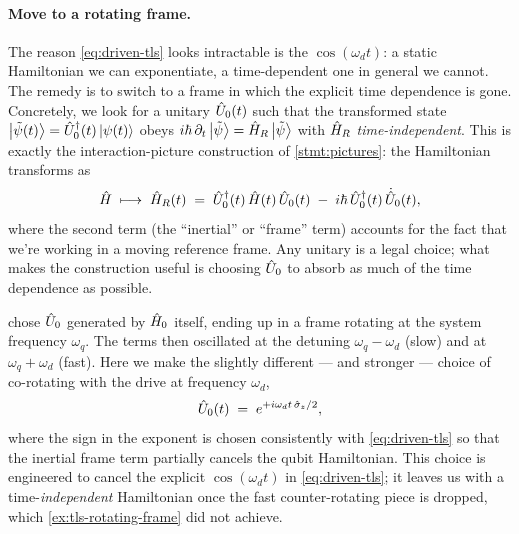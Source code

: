 \paragraph{Move to a rotating frame.}
The reason \cref{eq:driven-tls} looks intractable is the
$\cos(\omega_d t)$: a static Hamiltonian we can exponentiate, a
time-dependent one in general we cannot. The remedy is to switch
to a frame in which the explicit time dependence is gone.
Concretely, we look for a unitary $\hat{U}_0(t)$ such that the
transformed state $\ket{\tilde\psi(t)}=\hat{U}_0^\dagger(t)\ket{\psi(t)}$
obeys $i\hbar\,\partial_t\ket{\tilde\psi}=\hat{H}_R\ket{\tilde\psi}$
with $\hat{H}_R$ \emph{time-independent}. This is exactly the
interaction-picture construction of \cref{stmt:pictures}: the
Hamiltonian transforms as
\begin{equation}
\label{eq:frame-transform}
\hat{H} \;\longmapsto\;
\hat{H}_R(t) \;=\; \hat{U}_0^\dagger(t)\,\hat{H}(t)\,\hat{U}_0(t)
\;-\; i\hbar\,\hat{U}_0^\dagger(t)\,\dot{\hat{U}}_0(t),
\end{equation}
where the second term (the ``inertial'' or ``frame'' term) accounts
for the fact that we're working in a moving reference frame. Any
unitary is a legal choice; what makes the construction useful is
choosing $\hat{U}_0$ to absorb as much of the time dependence as
possible.

 chose $\hat{U}_0$ generated by
$\hat{H}_0$ itself, ending up in a frame rotating at the system
frequency $\omega_q$. The terms then oscillated at the detuning
$\omega_q-\omega_d$ (slow) and at $\omega_q+\omega_d$ (fast). Here
we make the slightly different --- and stronger --- choice of
co-rotating with the drive at frequency $\omega_d$,
\begin{equation}
\label{eq:rabi-rotating-unitary}
\hat{U}_0(t) \;=\; e^{+i\omega_d t\,\hat\sigma_z/2},
\end{equation}
where the sign in the exponent is chosen consistently with
\cref{eq:driven-tls} so that the inertial frame term partially
cancels the qubit Hamiltonian. This choice is engineered to cancel
the explicit $\cos(\omega_d t)$ in \cref{eq:driven-tls}; it leaves
us with a time-\emph{independent} Hamiltonian once the fast
counter-rotating piece is dropped, which
\cref{ex:tls-rotating-frame} did not achieve.

